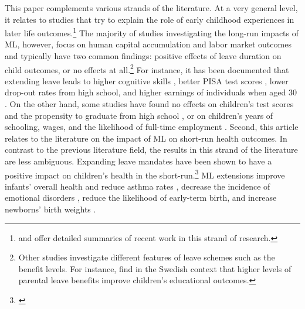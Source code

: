 This paper complements various strands of the literature. At a very general level, it relates to studies that try to explain the role of early childhood experiences in later life outcomes.\footnote{\cite{currie2011human} and \cite{almond2017childhood} offer detailed summaries of recent work in this strand of research.} The majority of studies investigating the long-run impacts of ML, however, focus on human capital accumulation and labor market outcomes and typically have two common findings: positive effects of leave duration on child outcomes, or no effects at all.\footnote{Other studies investigate different features of leave schemes such as the benefit levels. For instance, \cite{ginja2020parental} find in the Swedish context that higher levels of parental leave benefits improve children's educational outcomes.} For instance, it has been documented that extending leave leads to higher cognitive skills \citep{albagli2018}, better PISA test scores \citep{danzer2017}, lower drop-out rates from high school, and higher earnings of individuals when aged 30 \citep{carneiro2015flying}. On the other hand, some studies have found no effects on children's test scores and the propensity to graduate from high school \citep{Dahl2016Case}, or on children's years of schooling, wages, and the likelihood of full-time employment \citep{Dustmann2012}. Second, this article relates to the literature on the impact of ML on short-run health outcomes. In contrast to the previous literature field, the results in this strand of the literature are less ambiguous. Expanding leave mandates have been shown to have a positive impact on children's health in the short-run.\footnote{\label{rev_mlch: editor_beuchert_omission}} ML extensions improve infants' overall health and reduce asthma rates \citep{bullinger2019effect}, decrease the incidence of emotional disorders \citep{sayour2019impact}, reduce the likelihood of early-term birth, and increase newborns' birth weights \citep{stearns2015effects}.



